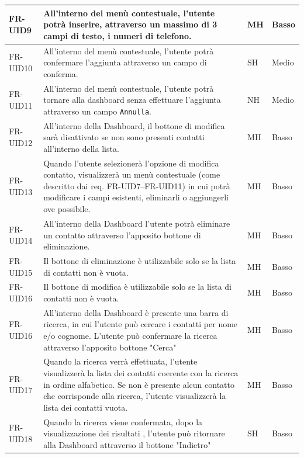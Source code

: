 \documentclass[a4paper,12pt]{article}
\begin{document}
\begin{longtable}{|l|p{8cm}|l|l|}
        \hline
        FR-UID9  & All'interno del menù contestuale, l'utente potrà inserire,
        attraverso un massimo di 3 campi di testo, i numeri di telefono. & MH & Basso \\
        \hline
        FR-UID10 & All'interno del menù contestuale, l'utente potrà confermare
        l'aggiunta attraverso un campo di conferma. & SH & Medio \\
        \hline
        FR-UID11 & All'interno del menù contestuale, l'utente potrà tornare alla dashboard
        senza effettuare l'aggiunta attraverso un campo \texttt{Annulla}. & NH & Medio \\
        \hline
        FR-UID12 & All'interno della Dashboard, il bottone di modifica sarà disattivato
        se non sono presenti contatti all'interno della lista. & MH & Basso \\
        \hline
        FR-UID13 & Quando l'utente selezionerà l'opzione di modifica contatto, visualizzerà
        un menù contestuale (come descritto dai req. FR-UID7--FR-UID11) in cui potrà
        modificare i campi esistenti, eliminarli o aggiungerli ove possibile. & MH & Basso \\
        \hline
        FR-UID14 & All'interno della Dashboard l'utente potrà eliminare un contatto
        attraverso l'apposito bottone di eliminazione. & MH & Basso \\
        \hline
        FR-UID15 & Il bottone di eliminazione è utilizzabile solo se la lista di contatti non è vuota. & MH & Basso \\ \hline
        FR-UID16  & Il bottone di modifica è utilizzabile solo se la lista di contatti non è vuota. & MH & Basso \\ \hline
        FR-UID16 & All'interno della Dashboard è presente una barra di ricerca, in cui l'utente può cercare i contatti per nome e/o cognome. L'utente può confermare la ricerca attraverso l'apposito bottone "Cerca" & MH & Basso \\ \hline
        FR-UID17 & Quando la ricerca verrà effettuata, l'utente visualizzerà la lista dei contatti coerente con la ricerca in ordine alfabetico. Se non è presente alcun contatto che corrisponde alla ricerca, l'utente visualizzerà la lista dei contatti vuota. & MH & Basso \\ \hline
        FR-UID18 & Quando la ricerca viene confermata, dopo la visualizzazione dei risultati , l'utente può ritornare alla Dashboard attraverso il bottone "Indietro" & SH & Basso \\ \hline
    \end{longtable}
\end{document}
